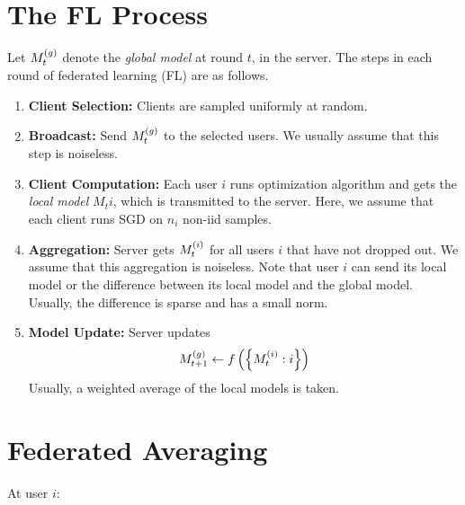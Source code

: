 \documentclass[twoside]{article}
\begin{document}



\section{The FL Process}

Let \(M_t^{\left(g\right)}\) denote the \emph{global model} at round \(t\), in the 
server. The steps in each round of federated learning (FL) are as follows.

\begin{enumerate}
    \item \textbf{Client Selection:} Clients are sampled uniformly at random.
    \item \textbf{Broadcast:} Send \(M_t^{\left(g\right)}\) to the selected users.
    We usually assume that this step is noiseless.
    \item \textbf{Client Computation:} Each user \(i\) runs optimization 
    algorithm and gets the \emph{local model} \(M_t{i}\), which is
    transmitted to the server. Here, we assume that each client runs SGD
    on \(n_i\) non-iid samples.
    \item \textbf{Aggregation:} Server gets \(M_t^{\left(i\right)}\) for all users
    \(i\) that have not dropped out. We assume that this aggregation is 
    noiseless. Note that user \(i\) can send its local model or the 
    difference between its local model and the global model. Usually, the
    difference is sparse and has a small norm.
    \item \textbf{Model Update:} Server updates
    \begin{equation}
        M_{t+1}^{\left(g\right)} \leftarrow f\left(\left\{M_t^{\left(i\right)}:i\right\}\right)
        \label{eq:update-gen}
    \end{equation}
    Usually, a weighted average of the local models is taken.
\end{enumerate}

\section{Federated Averaging}

At user \(i\):
\end{document}
